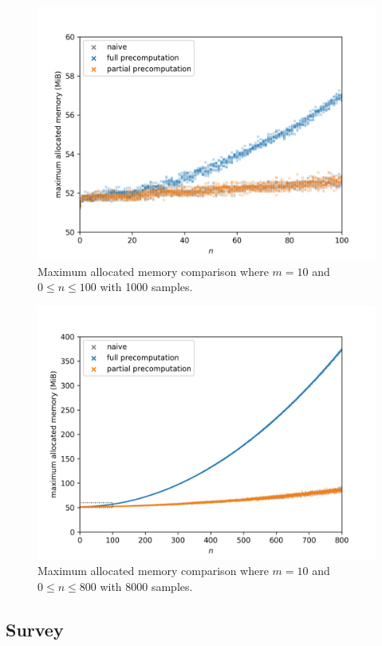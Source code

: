\begin{figure}[H]
	\centering
	\includegraphics[scale=0.7]{figures/precomputation_memory_small}
	\caption{Maximum allocated memory comparison where $m=10$ and $0\leq n\leq 100$ with 1000 samples.}
\end{figure}

\begin{figure}[H]
	\centering
	\includegraphics[scale=0.7]{figures/precomputation_memory_big}
	\caption{Maximum allocated memory comparison where $m=10$ and $0\leq n\leq 800$ with 8000 samples.}
\end{figure}

\subsection{Survey}

